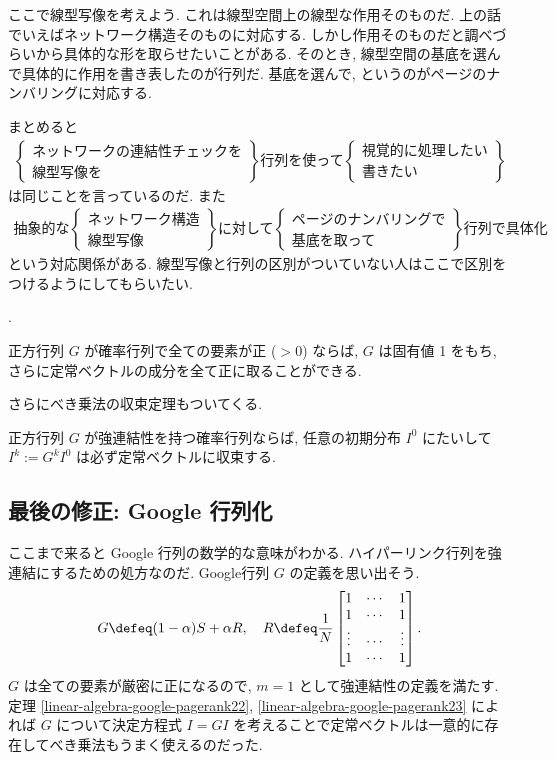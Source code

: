 \documentclass[openany, a4paper, oneside]{jsbook}
\begin{document}
{ここで線型写像を考えよう.
これは線型空間上の線型な作用そのものだ.
上の話でいえばネットワーク構造そのものに対応する.
しかし作用そのものだと調べづらいから具体的な形を取らせたいことがある.
そのとき, 線型空間の基底を選んで具体的に作用を書き表したのが行列だ.
基底を選んで, というのがページのナンバリングに対応する.

まとめると
\begin{align}
 \begin{Bmatrix}
  \text{ネットワークの連結性チェックを} \\
  \text{線型写像を}
 \end{Bmatrix}
 \text{行列を使って}
 \begin{Bmatrix}
  \text{視覚的に処理したい} \\
  \text{書きたい}
 \end{Bmatrix}
\end{align}
は同じことを言っているのだ.
また
\begin{align}
 \text{抽象的な}
 \begin{Bmatrix}
  \text{ネットワーク構造} \\
  \text{線型写像}
 \end{Bmatrix}
 \text{に対して}
 \begin{Bmatrix}
  \text{ページのナンバリングで} \\
  \text{基底を取って}
 \end{Bmatrix}
 \text{行列で具体化}
\end{align}
という対応関係がある.
線型写像と行列の区別がついていない人はここで区別をつけるようにしてもらいたい.}.
\begin{thm}\label{linear-algebra-google-pagerank22}
正方行列 $G$ が確率行列で全ての要素が正 ($>0$) ならば,
$G$ は固有値 1 をもち, さらに定常ベクトルの成分を全て正に取ることができる.
\end{thm}
さらにべき乗法の収束定理もついてくる.
\begin{thm}[離散時間マルコフ連鎖の収束定理]\label{linear-algebra-google-pagerank23}
正方行列 $G$ が強連結性を持つ確率行列ならば, 任意の初期分布 $I^0$ にたいして
$I^k := G^k I^0$ は必ず定常ベクトルに収束する.
\end{thm}
\subsection{最後の修正: Google 行列化}

ここまで来ると Google 行列の数学的な意味がわかる.
ハイパーリンク行列を強連結にするための処方なのだ.
Google行列 $G$ の定義を思い出そう.
\begin{align}
 G
 \defeq
 (1 - \alpha) S + \alpha R, \quad
 R
 \defeq
 \frac{1}{N}
 \begin{bmatrix}
  1      & \cdots & 1 \\
  1      & \cdots & 1 \\
  \vdots & \cdots & \vdots \\
  1      & \cdots & 1
 \end{bmatrix}.
\end{align}
$G$ は全ての要素が厳密に正になるので, $m=1$ として強連結性の定義を満たす.
定理 \ref{linear-algebra-google-pagerank22}, \ref{linear-algebra-google-pagerank23} によれば
$G$ について決定方程式 $I=GI$ を考えることで定常ベクトルは一意的に存在してべき乗法もうまく使えるのだった.
\end{document}
